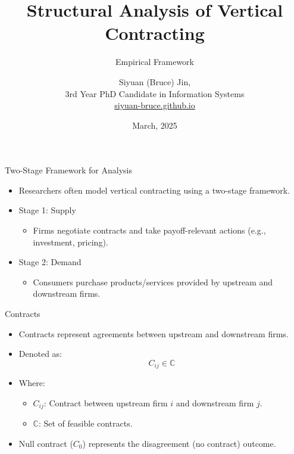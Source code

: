 \documentclass[aspectratio=169]{beamer}  %
\title{Structural Analysis of Vertical Contracting}
\subtitle{Empirical Framework}
\author{Siyuan (Bruce) Jin,\\ \small{3rd Year PhD Candidate in Information Systems}\\ \small{\href{https://siyuan-bruce.github.io}{siyuan-bruce.github.io}}}
\institute{Hong Kong University of Science and Technology}
\date{March, 2025}
\begin{document}
\begin{frame}
    \titlepage
\end{frame}

\begin{frame}{Two-Stage Framework for Analysis}
    \begin{itemize}
        \item Researchers often model vertical contracting using a two-stage framework.
        \item Stage 1: Supply
        \begin{itemize}
            \item Firms negotiate contracts and take payoff-relevant actions (e.g., investment, pricing).
        \end{itemize}
        \item Stage 2: Demand
        \begin{itemize}
            \item Consumers purchase products/services provided by upstream and downstream firms.
        \end{itemize}
    \end{itemize}
\end{frame}

\begin{frame}{Contracts}
    \begin{itemize}
        \item Contracts represent agreements between upstream and downstream firms.
        \item Denoted as:
        \[
        C_{ij} \in \mathbb{C}
        \]
        \item Where:
        \begin{itemize}
            \item \(C_{ij}\): Contract between upstream firm \(i\) and downstream firm \(j\).
            \item \(\mathbb{C}\): Set of feasible contracts.
        \end{itemize}
        \item Null contract (\(C_0\)) represents the disagreement (no contract) outcome.
    \end{itemize}
\end{frame}
\end{document}
